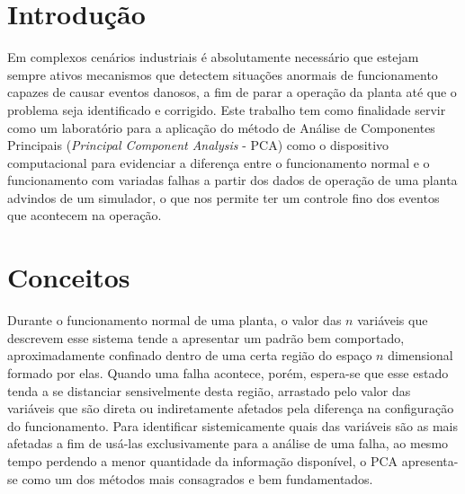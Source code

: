 \documentclass[journal]{IEEEtran}
\begin{document}
%
\IEEEpeerreviewmaketitle


\section{Introdução}
Em complexos cenários industriais é absolutamente necessário que
estejam sempre ativos mecanismos que detectem situações anormais
de funcionamento capazes de causar eventos danosos, a fim de
parar a operação da planta até que o problema seja identificado
e corrigido. Este trabalho tem como finalidade servir como um
laboratório para a aplicação do método de Análise de Componentes
Principais (\emph{Principal Component Analysis} - PCA) como o
dispositivo computacional para evidenciar a diferença entre o
funcionamento normal e o funcionamento com variadas falhas a partir
dos dados de operação de uma planta advindos de um simulador, o que
nos permite ter um controle fino dos eventos que acontecem na operação.



\section{Conceitos}

Durante o funcionamento normal de uma planta, o valor das $n$ variáveis
que descrevem esse sistema tende a apresentar um padrão bem comportado,
aproximadamente confinado dentro de uma certa região do espaço
$n$ dimensional formado por elas. Quando uma falha acontece, porém, espera-se
que esse estado tenda a se distanciar sensivelmente desta região, arrastado
pelo valor das variáveis que são direta ou indiretamente afetados
pela diferença na configuração do funcionamento. Para identificar
sistemicamente quais das variáveis são as mais afetadas a fim de usá-las
exclusivamente para a análise de uma falha, ao mesmo tempo perdendo a
menor quantidade da informação disponível, o PCA apresenta-se como um
dos métodos mais consagrados e bem fundamentados.  
\end{document}

